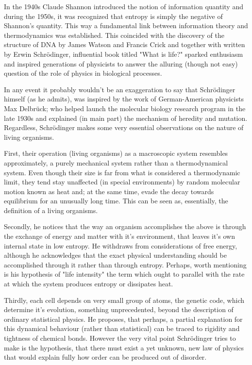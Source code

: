 \documentclass[a4paper,12pt]{article}
\begin{document}
In the 1940s Claude Shannon introduced the notion of information quantity \cite{Shannon:429164} and during the 1950s, it was recognized that entropy is simply the negative of Shannon's quantity. This way a fundamental link between information theory and thermodynamics was established. This coincided with the discovery of the structure of DNA by James Watson and Francis Crick and together with written by Erwin Schrödinger, influential book titled "What is life?" sparked enthusiasm and inspired generations of physicists to answer the alluring (though not easy) question of the role of physics in biological processes. 

In any event it probably wouldn't be an exaggeration to say that Schrödinger himself (as he admits), was inspired by the work of German-American physicists Max Delbrück; who helped launch the molecular biology research program in the late 1930s and explained (in main part) the mechanism of heredity and mutation.
Regardless, Schrödinger makes some very essential observations on the nature of living organisms.

First, their operation (living organisms) as a macroscopic system resembles approximately, a purely mechanical system rather than a thermodynamical system. 
Even though their size is far from what is considered a thermodynamic limit, they tend stay unaffected (in special environments) by random molecular motion known as heat and; at the same time, evade the decay towards equilibrium for an unusually long time. This can be seen as, essentially, the definition of a living organisms.

Secondly, he notices that the way an organism accomplishes the above is through the exchange of energy and matter with it's environment, that leaves it's own internal state in low entropy. He withdraws from considerations of free energy, although he acknowledges that the exact physical understanding should be accomplished through it rather than through entropy. Perhaps, worth mentioning is his hypothesis of "life intensity" the term which ought to parallel with the rate at which the system produces entropy or dissipates heat.

Thirdly, each cell depends on very small group of atoms, the genetic code, which determine it's evolution, something unprecedented, beyond the description of ordinary statistical physics. He proposes, that perhaps, a partial explanation for this dynamical behaviour (rather than statistical) can be traced to rigidity and tightness of chemical bonds. However the very vital point Schrödinger tries to make is the hypothesis, that there must exist a yet unknown, new law of physics that would explain fully how order can be produced out of disorder. 
\end{document}
